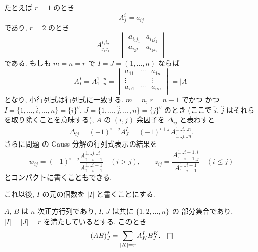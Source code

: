 \documentclass[12pt,twoside]{jarticle}
\begin{document}
たとえば $r=1$ のとき
\begin{equation*}
  A^i_j = a_{ij}
\end{equation*}
であり, $r=2$ のとき
\begin{equation*}
  A^{i_1i_2}_{j_1j_1} = 
  \begin{vmatrix}
    a_{i_1j_1} & a_{i_1j_2} \\
    a_{i_2j_1} & a_{i_2j_2} \\
  \end{vmatrix}
\end{equation*}
である.  もしも $m=n=r$ で $I=J=(1,\ldots,n)$ ならば
\begin{equation*}
  A^I_I = A^{1\ldots n}_{1\ldots n} = 
  \begin{vmatrix}
    a_{11} & \cdots & a_{1n} \\
    \vdots &        & \vdots \\
    a_{n1} & \cdots & a_{nn} \\
  \end{vmatrix}
  = |A|
\end{equation*}
となり, 小行列式は行列式に一致する. $m=n$, $r=n-1$ でかつ
かつ $I=\{1,\ldots,\widehat{i},\ldots,n\}=\{i\}^c$, %
$J=\{1,\ldots,\widehat{j},\ldots,n\}=\{j\}^c$ のとき
(ここで $\widehat{i}$, $\widehat{j}$ はそれらを取り除くことを意味する), 
$A$ の $(i,j)$ 余因子を $\Delta_{ij}$ と表わすと
\begin{equation*}
  \Delta_{ij} = (-1)^{i+j} A^I_J =
  (-1)^{i+j} A^{1\ldots\widehat{i}\ldots n}_{1\ldots\widehat{j}\ldots n}.
\end{equation*}
さらに問題  の Gauss 分解の行列式表示の結果を
\begin{equation*}
  w_{ij} = (-1)^{i+j}\frac
  {A^{1\ldots\widehat{j}\ldots i}_{1\ldots i-1}}
  {A^{1\ldots i-1}_{1\ldots i-1}}
  \quad (i>j),
  \qquad
  z_{ij} = \frac
  {A^{1\ldots i-1,i}_{1\ldots i-1,j}}
  {A^{1\ldots i-1}_{1\ldots i-1}}
  \quad (i\le j)
\end{equation*}
とコンパクトに書くこともできる.


\medskip

これ以後, $I$ の元の個数を $|I|$ と書くことにする. 


\begin{question}
  \label{q:minor(AB)=minor(A)minor(B)}
  $A$, $B$ は $n$ 次正方行列であり, $I$, $J$ は共に $\{1,2,\ldots,n\}$ の
  部分集合であり, $|I|=|J|=r$ を満たしているとする. このとき
  \begin{equation*}
    (AB)^I_J = \sum_{|K|=r} A^I_K B^K_J.
    \qed
  \end{equation*}
\end{question}
\end{document}
